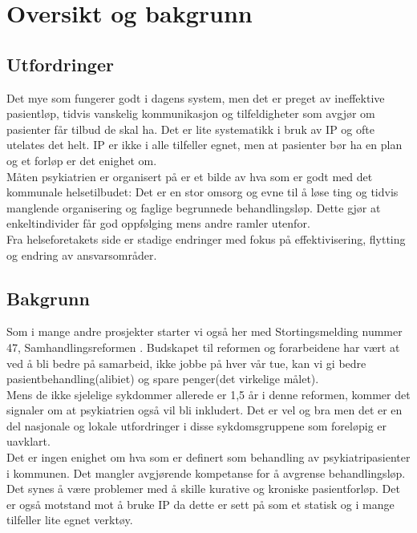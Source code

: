 \documentclass[11pt]{report} %
\begin{document}
\renewcommand{\chaptername}{Del}
\tableofcontents

\chapter{Oversikt og bakgrunn}\label{chap:ov}
  \section{Utfordringer}\label{sec:ov_utf}
    Det mye som fungerer godt i dagens system, men det er preget av ineffektive pasientløp, tidvis vanskelig kommunikasjon og tilfeldigheter som avgjør om pasienter får tilbud de skal ha. Det er lite systematikk i bruk av IP og ofte utelates det helt. IP er ikke i alle tilfeller egnet, men at pasienter bør ha en plan og et forløp er det enighet om. \\
    Måten psykiatrien er organisert på er et bilde av hva som er godt med det kommunale helsetilbudet: Det er en stor omsorg og evne til å løse ting og tidvis manglende organisering og faglige begrunnede behandlingsløp. Dette gjør at enkeltindivider får god oppfølging mens andre ramler utenfor. \\
    Fra helseforetakets side er stadige endringer med fokus på effektivisering, flytting og endring av ansvarsområder.\\

  \section{Bakgrunn}\label{sec:ov_bakg}
    Som i mange andre prosjekter starter vi også her med Stortingsmelding nummer 47, Samhandlingsreformen
    \cite{Stmld47}. Budskapet til reformen og forarbeidene har vært at ved å bli bedre på samarbeid, ikke jobbe på hver vår tue, kan vi gi bedre pasientbehandling(alibiet) og spare penger(det virkelige målet). \\
    Mens de ikke sjelelige sykdommer allerede er 1,5 år i denne reformen, kommer det signaler om at psykiatrien også vil bli inkludert. Det er vel og bra men det er en del nasjonale og lokale utfordringer i disse sykdomsgruppene som foreløpig er uavklart. \\
    Det er ingen enighet om hva som er definert som behandling av psykiatripasienter i kommunen. Det mangler avgjørende kompetanse for å avgrense behandlingsløp. Det synes å være problemer med å skille kurative og kroniske pasientforløp. Det er også motstand mot å bruke IP da dette er sett på som et statisk og i mange tilfeller lite egnet verktøy. \\
\end{document}
